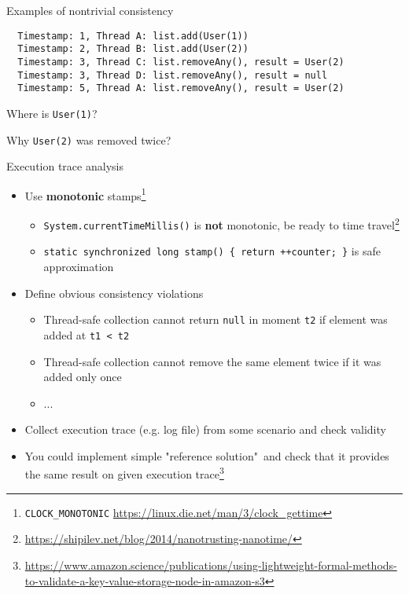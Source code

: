 \begin{frame}[fragile]{Examples of nontrivial consistency}

\begin{verbatim}
  Timestamp: 1, Thread A: list.add(User(1))
  Timestamp: 2, Thread B: list.add(User(2))
  Timestamp: 3, Thread C: list.removeAny(), result = User(2)
  Timestamp: 3, Thread D: list.removeAny(), result = null
  Timestamp: 5, Thread A: list.removeAny(), result = User(2)
\end{verbatim}

\pause

Where is \texttt{User(1)}?

\pause

Why \texttt{User(2)} was removed twice?

\end{frame}

\begin{frame}{Execution trace analysis}
 
 \begin{itemize}
   \item Use \textbf{monotonic} stamps\footnote{\tiny\texttt{CLOCK\_MONOTONIC} \url{https://linux.die.net/man/3/clock_gettime}}
   \pause
   \begin{itemize}
     \item \texttt{System.currentTimeMillis()} is \textbf{not} monotonic, be ready to time travel\footnote<2->{\tiny\url{https://shipilev.net/blog/2014/nanotrusting-nanotime/}}

     \pause
     \item \texttt{static synchronized long stamp() \{ return ++counter; \}} is safe approximation
   \end{itemize}
 
   \pause
 
   \item Define obvious consistency violations
   \begin{itemize}
     \item Thread-safe collection cannot return \texttt{null} in moment \texttt{t2} if element was added at \texttt{t1 < t2}
     \item Thread-safe collection cannot remove the same element twice if it was added only once
     \item ...
   \end{itemize}
 
   \pause
   \item Collect execution trace (e.g. log file) from some scenario and check validity
 
   \pause
   \item You could implement simple "reference solution"\ and check that it provides the same result on given execution trace\footnote<6->{\tiny\url{https://www.amazon.science/publications/using-lightweight-formal-methods-to-validate-a-key-value-storage-node-in-amazon-s3}}
 \end{itemize}
 
\end{frame}


